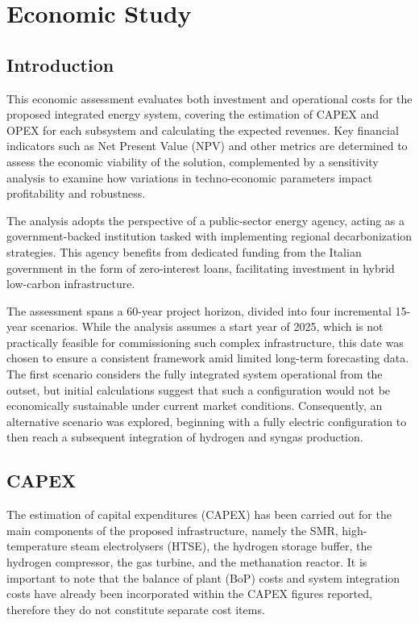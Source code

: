 \section{Economic Study}

\subsection{Introduction}
This economic assessment evaluates both investment and operational costs for the proposed integrated energy system, covering the estimation of CAPEX and OPEX for each subsystem and calculating the expected revenues. Key financial indicators such as Net Present Value (NPV) and other metrics are determined to assess the economic viability of the solution, complemented by a sensitivity analysis to examine how variations in techno-economic parameters impact profitability and robustness.

The analysis adopts the perspective of a public-sector energy agency, acting as a government-backed institution tasked with implementing regional decarbonization strategies. This agency benefits from dedicated funding from the Italian government in the form of zero-interest loans, facilitating investment in hybrid low-carbon infrastructure.

The assessment spans a 60-year project horizon, divided into four incremental 15-year scenarios. While the analysis assumes a start year of 2025, which is not practically feasible for commissioning such complex infrastructure, this date was chosen to ensure a consistent framework amid limited long-term forecasting data. The first scenario considers the fully integrated system operational from the outset, but initial calculations suggest that such a configuration would not be economically sustainable under current market conditions. Consequently, an alternative scenario was explored, beginning with a fully electric configuration to then reach a subsequent integration of hydrogen and syngas production.

\subsection{CAPEX}
The estimation of capital expenditures (CAPEX) has been carried out for the main components of the proposed infrastructure, namely the SMR, high-temperature steam electrolysers (HTSE), the hydrogen storage buffer, the hydrogen compressor, the gas turbine, and the methanation reactor. It is important to note that the balance of plant (BoP) costs and system integration costs have already been incorporated within the CAPEX figures reported, therefore they do not constitute separate cost items.

